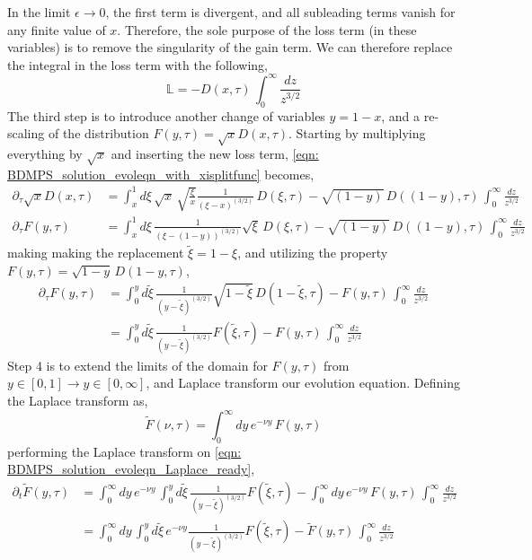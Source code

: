 \documentclass[main.tex]{subfiles}
\begin{document}
In the limit \(\epsilon \rightarrow 0\), the first term is divergent, and all subleading terms vanish for any finite value of \(x\). Therefore, the sole purpose of the loss term (in these variables) is to remove the singularity of the gain term.  We can therefore replace the integral in the loss term with the following, 
\begin{equation}
    \mathbb{L} = - D(x,\tau) \, \int_0^\infty \frac{dz}{z^{3/2}}
\end{equation}
The third step is to introduce another change of variables \(y = 1-x\), and a re-scaling of the distribution \(F(y, \tau ) = \sqrt{x} D(x,\tau)\). Starting by multiplying everything by \(\sqrt{x}\) and inserting the new loss term, \autoref{eqn: BDMPS_solution_evoleqn_with_xisplitfunc} becomes,
\begin{align}\label{eqn: BDMPS_solution_evoleqn_with_F(y,tau)}
    \partial_\tau \sqrt{x} D(x,\tau) &= \int_x^1 d\xi \,\sqrt{x}\, \sqrt{\frac{\xi}{x}} \frac{1}{(\xi-x)^{(3/2)}} \,D(\xi, \tau) - \sqrt{(1-y)}\, D((1-y),\tau) \, \int_0^\infty \frac{dz}{z^{3/2}} \nonumber \\
    \partial_\tau F(y,\tau) &= \int_x^1 d\xi \, \frac{1}{(\xi-(1-y))^{(3/2)}} \sqrt{\xi} \,D(\xi, \tau) - \sqrt{(1-y)}\, D((1-y),\tau) \, \int_0^\infty \frac{dz}{z^{3/2}}
\end{align}
making making the replacement \(\tilde{\xi}  = 1- \xi\), and utilizing the property \(F(y, \tau ) = \sqrt{1-y} \,D(1-y,\tau)\),
\begin{align}\label{eqn: BDMPS_solution_evoleqn_Laplace_ready}
    \partial_\tau F(y,\tau) &= \int_0^{y} d\tilde{\xi} \, \frac{1}{(y-\tilde{\xi})^{(3/2)}} \sqrt{1-\tilde{\xi}} \,D(1-\tilde{\xi}, \tau) - F(y,\tau) \, \int_0^\infty \frac{dz}{z^{3/2}} \nonumber \\
    &= \int_0^{y} d\tilde{\xi} \, \frac{1}{(y-\tilde{\xi})^{(3/2)}} F(\tilde{\xi}, \tau) - F(y,\tau) \, \int_0^\infty \frac{dz}{z^{3/2}}
\end{align}
Step 4 is to extend the limits of the domain for \(F(y,\tau)\) from \(y\in[0,1] \rightarrow y \in [0, \infty]\), and Laplace transform our evolution equation. Defining the Laplace transform as, 
\begin{equation}\label{eqn: BDMPS_solution_Laplace_definition}
    \tilde{F}(\nu, \tau) = \int_0^\infty dy \, e^{-\nu y}\, F(y,\tau)
\end{equation}
performing the Laplace transform on \autoref{eqn: BDMPS_solution_evoleqn_Laplace_ready},
\begin{align}\label{eqn: BDMPS_solution_laplace_step1}
    \partial_t \tilde{F}(y,\tau) &= \int_0^\infty dy\, e^{-\nu y}\,  \int_0^{y} d\tilde{\xi} \, \frac{1}{(y-\tilde{\xi})^{(3/2)}} F(\tilde{\xi}, \tau) - \int_0^\infty dy \, e^{-\nu y}\, F(y,\tau) \, \int_0^\infty \frac{dz}{z^{3/2}} \nonumber \\
    &= \int_0^\infty dy\, \int_0^{y} d\tilde{\xi} \, e^{-\nu y} \frac{1}{(y-\tilde{\xi})^{(3/2)}} F(\tilde{\xi}, \tau) - \tilde{F}(y,\tau) \, \int_0^\infty \frac{dz}{z^{3/2}}
\end{align}
\end{document}

